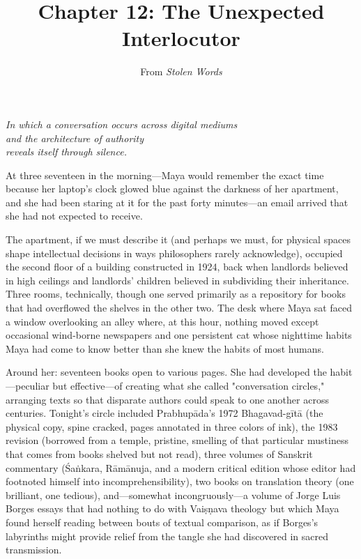 \documentclass[12pt]{article}
\title{Chapter 12: The Unexpected Interlocutor}
\author{From \textit{Stolen Words}}
\date{}
\begin{document}
\maketitle

\vspace{1cm}

{\centering\itshape In which a conversation occurs across digital mediums\\and the architecture of authority\\reveals itself through silence.\par}
\vspace{0.5cm}

\justifying

At three seventeen in the morning—Maya would remember the exact time because her laptop's clock glowed blue against the darkness of her apartment, and she had been staring at it for the past forty minutes—an email arrived that she had not expected to receive.

The apartment, if we must describe it (and perhaps we must, for physical spaces shape intellectual decisions in ways philosophers rarely acknowledge), occupied the second floor of a building constructed in 1924, back when landlords believed in high ceilings and landlords' children believed in subdividing their inheritance. Three rooms, technically, though one served primarily as a repository for books that had overflowed the shelves in the other two. The desk where Maya sat faced a window overlooking an alley where, at this hour, nothing moved except occasional wind-borne newspapers and one persistent cat whose nighttime habits Maya had come to know better than she knew the habits of most humans.

Around her: seventeen books open to various pages. She had developed the habit—peculiar but effective—of creating what she called "conversation circles," arranging texts so that disparate authors could speak to one another across centuries. Tonight's circle included Prabhupāda's 1972 Bhagavad-gītā (the physical copy, spine cracked, pages annotated in three colors of ink), the 1983 revision (borrowed from a temple, pristine, smelling of that particular mustiness that comes from books shelved but not read), three volumes of Sanskrit commentary (Śaṅkara, Rāmānuja, and a modern critical edition whose editor had footnoted himself into incomprehensibility), two books on translation theory (one brilliant, one tedious), and—somewhat incongruously—a volume of Jorge Luis Borges essays that had nothing to do with Vaiṣṇava theology but which Maya found herself reading between bouts of textual comparison, as if Borges's labyrinths might provide relief from the tangle she had discovered in sacred transmission.
\end{document}
